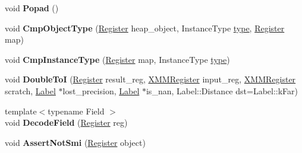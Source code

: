 \begin{DoxyCompactItemize}
\mbox{\label{classv8_1_1internal_1_1MacroAssembler_a4541fdd679e9f53acc2001a6d06934a4}} 
void {\bfseries Popad} ()
\item 
\mbox{\label{classv8_1_1internal_1_1MacroAssembler_a7cad173de429b180500db0567b870157}} 
void {\bfseries Cmp\+Object\+Type} (\mbox{\hyperlink{classv8_1_1internal_1_1Register}{Register}} heap\+\_\+object, Instance\+Type \mbox{\hyperlink{classstd_1_1conditional_1_1type}{type}}, \mbox{\hyperlink{classv8_1_1internal_1_1Register}{Register}} map)
\item 
\mbox{\label{classv8_1_1internal_1_1MacroAssembler_a9ff965591c4a4cc8de5ed85162454fe1}} 
void {\bfseries Cmp\+Instance\+Type} (\mbox{\hyperlink{classv8_1_1internal_1_1Register}{Register}} map, Instance\+Type \mbox{\hyperlink{classstd_1_1conditional_1_1type}{type}})
\item 
\mbox{\label{classv8_1_1internal_1_1MacroAssembler_a4727c40add81050dc78996ffa69b01ee}} 
void {\bfseries Double\+ToI} (\mbox{\hyperlink{classv8_1_1internal_1_1Register}{Register}} result\+\_\+reg, \mbox{\hyperlink{classv8_1_1internal_1_1XMMRegister}{X\+M\+M\+Register}} input\+\_\+reg, \mbox{\hyperlink{classv8_1_1internal_1_1XMMRegister}{X\+M\+M\+Register}} scratch, \mbox{\hyperlink{classv8_1_1internal_1_1Label}{Label}} $\ast$lost\+\_\+precision, \mbox{\hyperlink{classv8_1_1internal_1_1Label}{Label}} $\ast$is\+\_\+nan, Label\+::\+Distance dst=Label\+::k\+Far)
\item 
\mbox{\label{classv8_1_1internal_1_1MacroAssembler_a132efbdb5d6abe37ed26edc851c715f0}} 
{\footnotesize template$<$typename Field $>$ }\\void {\bfseries Decode\+Field} (\mbox{\hyperlink{classv8_1_1internal_1_1Register}{Register}} reg)
\item 
\mbox{\label{classv8_1_1internal_1_1MacroAssembler_af70fc3cc2353f24bf73f868930906bcc}} 
void {\bfseries Assert\+Not\+Smi} (\mbox{\hyperlink{classv8_1_1internal_1_1Register}{Register}} object)
\item 
\mbox{\label{classv8_1_1internal_1_1MacroAssembler_aca8963bd0a98454d6ad0e4aa34d8cab8}} 

\end{DoxyCompactItemize}
